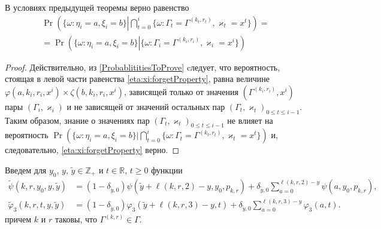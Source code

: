 \documentclass[a4paper,12pt,russian]{extarticle}
\newcommand{\ml}[1]{\begin{multline}#1\end{multline}}
\begin{document}
\begin{corollary}
В условиях предыдущей теоремы верно равенство
\ml
{
\Pr \left(\{ \omega \colon \eta_i = a, \xi_i=b\} \left|\bigcap_{t=0}^{i}\{\omega\colon \Gamma_t=\Gamma^{(k_t,r_t)}, \varkappa_t=x^t\}\right.\right)=\\
=\Pr \left(\{ \omega \colon \eta_i = a, \xi_i=b\} \left|\{\omega\colon \Gamma_i=\Gamma^{(k_i,r_i)}, \varkappa_i=x^i\}\right.\right)
\label{eta:xi:forgetProperty}
}
\label{eta:xi:forget}
\end{corollary}
\begin{proof}
Действительно, из \eqref{ProbablititiesToProve} cледует, что вероятность, стоящая в левой части равенства \eqref{eta:xi:forgetProperty}, равна величине $\varphi(a,k_i,r_i,x^i)\times \zeta(b,k_i,r_i,x^i)$, зависящей только от значения $(\Gamma^{(k_i,r_i)},x^i)$ пары $(\Gamma_i,\varkappa_i)$ и не зависящей от значений остальных пар $(\Gamma_t,\varkappa_t)_{0\leqslant t \leqslant i-1}$. Таким образом, знание о значениях пар $(\Gamma_t,\varkappa_t)_{0\leqslant t \leqslant i-1}$ не влияет на вероятность $\Pr (\{ \omega \colon \eta_i = a, \xi_i=b\} |\bigcap_{t=0}^{i}\{\omega\colon \Gamma_t=\Gamma^{(k_t,r_t)}, \varkappa_t=x^t\})$ и, следовательно, \eqref{eta:xi:forgetProperty} верно.
\end{proof}

Введем для $y_0$, $y$, $\tilde{y} \in \mathbb{Z}_+$ и $t \in \mathbb{R}$, $t\geqslant 0$ функции
\begin{equation}
\begin{aligned}
\widetilde{\psi}(k,r,y_0,y,\tilde{y}) &= 
(1 - \delta_{\tilde{y},0}) \psi(\tilde{y}+\ell(k,r,2)-y,y_0, p_{k,r}) + \delta_{\tilde{y},0}\sum_{a=0}^{\ell(k,r,2)-y} \psi(a,y_0, p_{k,r}),\\
\widetilde{\varphi}_3(k,r,t,y,\tilde{y}) &= (1-\delta_{\tilde{y},0}) \varphi_3(\tilde{y} + \ell(k,r,3)-y,t)  +\delta_{\tilde{y},0}\sum_{a=0}^{\ell(k,r,3)-y} \varphi_3(a,t).
\end{aligned}
\label{tildephi}
\end{equation}
причем $k$ и $r$ таковы, что $\Gamma^{(k,r)}\in \Gamma$.
	
\end{document}
